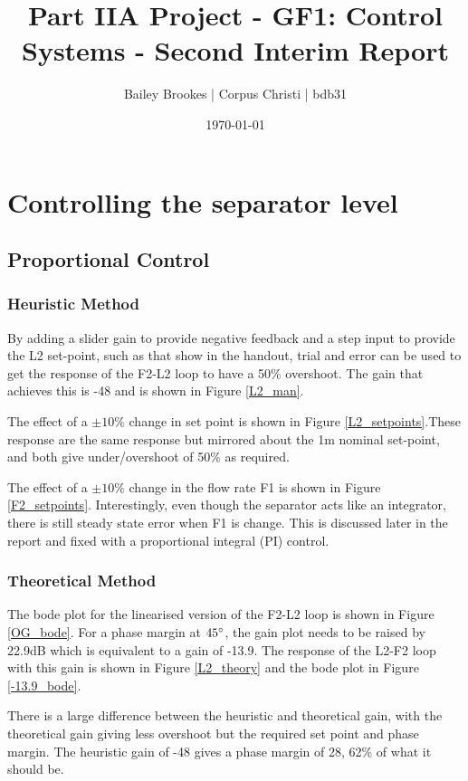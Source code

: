 \documentclass[11pt]{article}
\title{Part IIA Project - GF1: Control Systems - Second Interim Report}
\author{Bailey Brookes | Corpus Christi | bdb31}
\date{\today}
\begin{document}
\maketitle

\section{Controlling the separator level}

\subsection{Proportional Control}

\subsubsection{Heuristic Method}
By adding a slider gain to provide negative feedback and a step input to provide the L2 set-point, such as that show in the handout, trial and error can be used to get the response of the F2-L2 loop to have a 50\% overshoot. The gain that achieves this is -48 and is shown in Figure \ref{L2_man}.

The effect of a $\pm10\%$ change in set point is shown in Figure \ref{L2_setpoints}.These response are the same response but mirrored about the 1m nominal set-point, and both give under/overshoot of 50\% as required.

The effect of a $\pm10\%$ change in the flow rate F1 is shown in Figure \ref{F2_setpoints}. Interestingly, even though the separator acts like an integrator, there is still steady state error when F1 is change. This is discussed later in the report and fixed with a proportional integral (PI) control.

\subsubsection{Theoretical Method}
The bode plot for the linearised version of the F2-L2 loop is shown in Figure \ref{OG_bode}. For a phase margin at $45\degree$, the gain plot needs to be raised by 22.9dB which is equivalent to a gain of -13.9. The response of the L2-F2 loop with this gain is shown in Figure \ref{L2_theory} and the bode plot in Figure \ref{-13.9_bode}. 

There is a large difference between the heuristic and theoretical gain, with the theoretical gain giving less overshoot but the required set point and phase margin. The heuristic gain of -48 gives a phase margin of 28\degree, 62\% of what it should be. 
\end{document}
